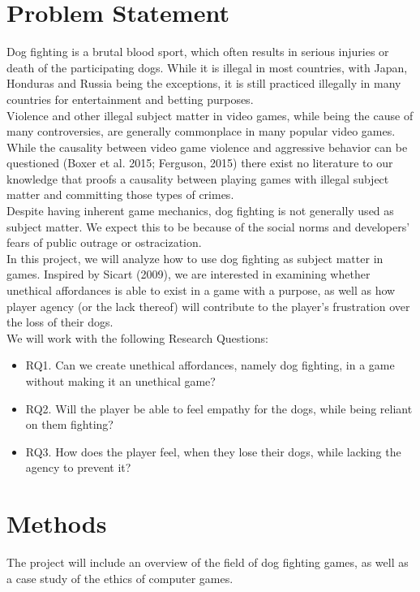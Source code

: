 \documentclass[preprint,12pt, authoryear]{elsarticle}
\begin{document}
\section{Problem Statement}
\label{ProbStat}

Dog fighting is a brutal blood sport, which often results in serious injuries or death of the participating dogs. While it is illegal in most countries, with Japan, Honduras and Russia being the exceptions, it is still practiced illegally in many countries for entertainment and betting purposes. \\

Violence and other illegal subject matter in video games, while being the cause of many controversies, are generally commonplace in many popular video games. While the causality between video game violence and aggressive behavior can be questioned (Boxer et al. 2015; Ferguson, 2015) there exist no literature to our knowledge that proofs a causality between playing games with illegal subject matter and committing those types of crimes. \\

Despite having inherent game mechanics, dog fighting is not generally used as subject matter. We expect this to be because of the social norms and developers’ fears of public outrage or ostracization. \\

In this project, we will analyze how to use dog fighting as subject matter in games. Inspired by Sicart (2009), we are interested in examining whether unethical affordances is able to exist in a game with a purpose, as well as how player agency (or the lack thereof) will contribute to the player’s frustration over the loss of their dogs. \\

We will work with the following Research Questions:

\begin{itemize}
\item RQ1. Can we create unethical affordances, namely dog fighting, in a game without making it an unethical game?
\item RQ2. Will the player be able to feel empathy for the dogs, while being reliant on them fighting?
\item RQ3. How does the player feel, when they lose their dogs, while lacking the agency to prevent it?
\end{itemize}

\section{Methods}
The project will include an overview of the field of dog fighting games, as well as a case study of the ethics of computer games. \\
\end{document}
